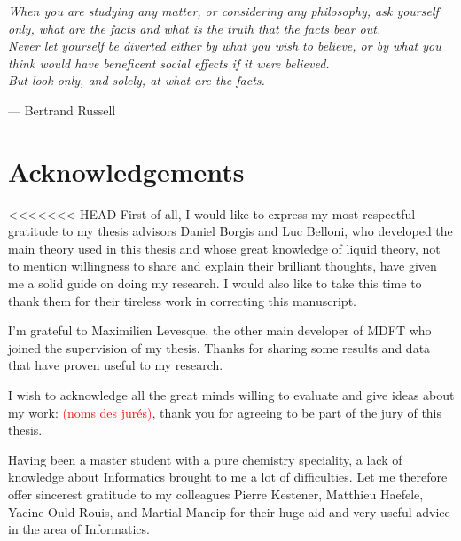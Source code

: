 
\begin{flushright}
\textsl{When you are studying any matter, or considering any philosophy,
ask yourself only, what are the facts and what is the truth that the
facts bear out.}\\
\textsl{ Never let yourself be diverted either by what you wish to
believe, or by what you think would have beneficent social effects
if it were believed.}\\
\textsl{ But look only, and solely, at what are the facts.}
\par\end{flushright}

\begin{flushright}
--- Bertrand Russell 
\par\end{flushright}

\bigskip{}


\begingroup
\let\clearpage\relax
\let\cleardoublepage\relax 


\chapter*{Acknowledgements}

<<<<<<< HEAD
First of all, I would like to express my most respectful gratitude
to my thesis advisors Daniel Borgis and Luc Belloni, who developed
the main theory used in this thesis and whose great knowledge of liquid
theory, not to mention willingness to share and explain their brilliant
thoughts, have given me a solid guide on doing my research. I would
also like to take this time to thank them for their tireless work
in correcting this manuscript.

I'm grateful to Maximilien Levesque, the other main developer of MDFT
who joined the supervision of my thesis. Thanks for sharing some results
and data that have proven useful to my research.

I wish to acknowledge all the great minds willing to evaluate and
give ideas about my work: \textcolor{red}{(noms des jurés)}, thank
you for agreeing to be part of the jury of this thesis.

Having been a master student with a pure chemistry speciality, a lack
of knowledge about Informatics brought to me a lot of difficulties.
Let me therefore offer sincerest gratitude to my colleagues Pierre
Kestener, Matthieu Haefele, Yacine Ould-Rouis, and Martial Mancip
for their huge aid and very useful advice in the area of Informatics.


